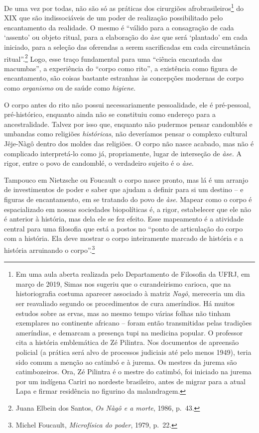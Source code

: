 De uma vez por todas, não são só as práticas dos cirurgiões
afrobrasileiros\footnote{Em uma aula aberta realizada pelo Departamento
  de Filosofia da UFRJ, em março de 2019, Simas nos sugeriu que o
  curandeirismo carioca, que na historiografia costuma aparecer
  associado à matriz \emph{Nagô}, mereceria um dia ser reavaliado
  segundo os procedimentos de cura ameríndios. Há muitos estudos sobre
  as ervas, mas ao mesmo tempo várias folhas não tinham exemplares no
  continente africano -- foram então transmitidas pelas tradições
  ameríndias, e demarcam a presença tupi na medicina popular. O
  professor cita a história emblemática de Zé Pilintra. Nos documentos
  de apreensão policial (a prática será alvo de processos judiciais até
  pelo menos 1949), teria sido comum a menção ao catimbó e à jurema. Os
  mestres da jurema são catimbozeiros. Ora, Zé Pilintra é o mestre do
  catimbó, foi iniciado na jurema por um indígena Cariri no nordeste
  brasileiro, antes de migrar para a atual Lapa e firmar residência no
  figurino da malandragem.} do XIX que são indissociáveis de um poder de
realização possibilitado pelo encantamento da realidade. O mesmo é
``válido para a consagração de cada `assento' ou objeto ritual, para a
elaboração do \emph{àse} que será `plantado' em cada iniciado, para a
seleção das oferendas a serem sacrificadas em cada circunstância
ritual''.\footnote{Juana Elbein dos Santos, \emph{Os Nàgô e a morte},
  1986, p.~43.} Logo, esse traço fundamental para uma ``ciência
encantada das macumbas'', a experiência do ``corpo como rito'', a
existência como figura de encantamento, são coisas bastante estranhas às
concepções modernas de corpo como \emph{organismo} ou de saúde como
\emph{higiene}.

O corpo antes do rito não possui necessariamente pessoalidade, ele é
pré-pessoal, pré-histórico, enquanto ainda não se constituiu como
endereço para a ancestralidade. Talvez por isso que, enquanto não
pudermos pensar candomblés e umbandas como religiões \emph{históricas},
não deveríamos pensar o complexo cultural Jêje-Nàgô dentro dos moldes
das religiões. O corpo não nasce acabado, mas não é complicado
interpretá-lo como já, propriamente, lugar de interseção de \emph{àse.}
A rigor, entre o povo de candomblé, o verdadeiro sujeito é o \emph{àse}.

Tampouco em Nietzsche ou Foucault o corpo nasce pronto, mas lá é um
arranjo de investimentos de poder e saber que ajudam a definir para si
um destino -- e figuras de encantamento, em se tratando do povo de
\emph{àse}. Mapear como o corpo é espacializado em nossas sociedades
biopolíticas é, a rigor, estabelecer que ele não é anterior à história,
mas dela ele se fez efeito. Esse mapeamento é a atividade central para
uma filosofia que está a postos no ``ponto de articulação do corpo com a
história. Ela deve mostrar o corpo inteiramente marcado de história e a
história arruinando o corpo''.\footnote{Michel Foucault,
  \emph{Microfísica do poder}, 1979, p.~22.}

